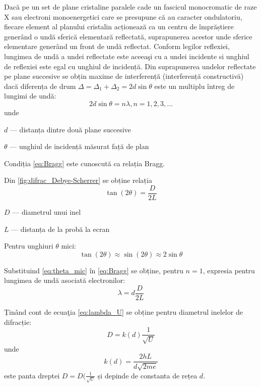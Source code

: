 \documentclass[a4paper]{article}
\begin{document}
Dacă pe un set de plane cristaline paralele cade un fascicul monocromatic de
raze X sau electroni monoenergetici care se presupune că au caracter
ondulatoriu, fiecare element al planului cristalin acționează ca un centru de
împrăștiere generând o undă sferică elementară reflectată, suprapunerea acestor
unde sferice elementare generând un front de undă reflectat. Conform legilor
reflexiei, lungimea de undă a undei reflectate este aceeaşi cu a undei incidente
si unghiul de reflexiei este egal cu unghiul de incidență. Din suprapunerea
undelor reflectate pe plane succesive se obțin maxime de interferență
(interferență constructivă) dacă diferența de drum $\Delta = \Delta_1 + \Delta_2
	= 2 d \sin \theta$ este un multiplu întreg de lungimi de undă:
\begin{equation} \label{eq:Bragg}
	2 d \sin \theta = n \lambda, n = 1, 2, 3, \dots
\end{equation}
unde
\begin{description}
	\item $d$ --- distanța dintre două plane succesive
	\item $\theta$ --- unghiul de incidență măsurat față de plan
\end{description}

Condiția \eqref{eq:Bragg} este cunoscută ca relația Bragg.

Din \ref{fig:difrac_Debye-Scherrer} se obține relația
\begin{equation}
	\tan(2 \theta) = \frac{D}{2 L}
\end{equation}
\begin{description}
	\item $D$ --- diametrul unui inel
	\item $L$ --- distanța de la probă la ecran
\end{description}

Pentru unghiuri $\theta$ mici:
\begin{equation} \label{eq:theta_mic}
	\tan(2 \theta) \approx \sin(2 \theta) \approx 2 \sin \theta
\end{equation}

Substituind \eqref{eq:theta_mic} în \eqref{eq:Bragg} se obține, pentru $n = 1$,
expresia pentru lungimea de undă asociată electronilor:
\begin{equation}
	\lambda = d \frac{D}{2L}
\end{equation}

Ținând cont de ecuaţia \eqref{eq:lambda_U} se obține pentru diametrul inelelor
de difracție:
\begin{equation}
	D = k(d) \frac{1}{\sqrt{U}}
\end{equation}
unde
\begin{equation}
	k(d) = \frac{2hL}{d \sqrt{2 m e}}
\end{equation}
este panta dreptei $D = D(\frac{1}{\sqrt{U}}$ și depinde de constanta de rețea $d$.
\end{document}
